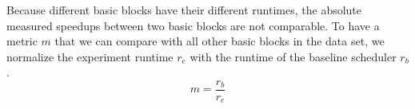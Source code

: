 Because different basic blocks have their different runtimes, the absolute measured speedups between two basic blocks are not comparable.
To have a metric $m$ that we can compare with all other basic blocks in the data set, we normalize the experiment runtime $r_e$ with the runtime of the baseline scheduler $r_b$.
\begin{equation}
    m=\frac{r_b}{r_e}
    \label{eqn:approach:mcts-score}
\end{equation}

